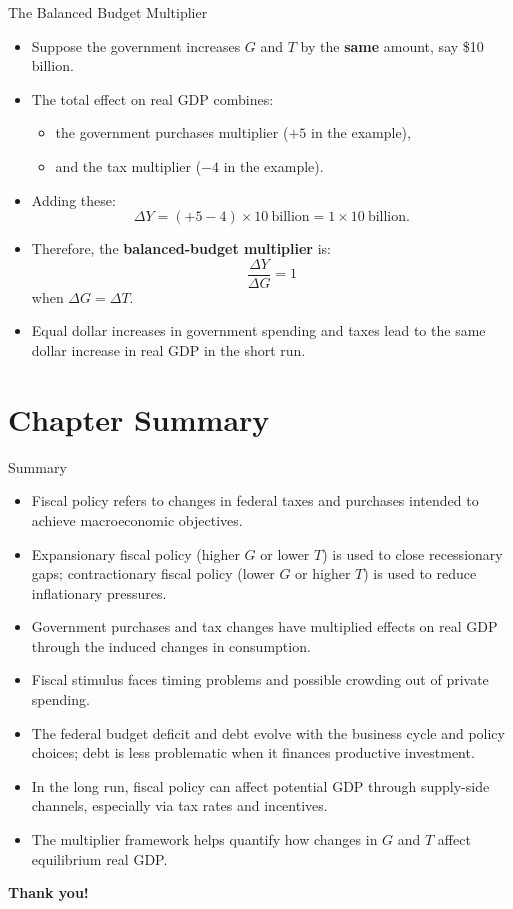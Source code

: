 \documentclass[aspectratio=169]{beamer}
\begin{document}
\begin{frame}{The Balanced Budget Multiplier}
\transfade
\begin{itemize}[<+->]
  \item Suppose the government increases \(G\) and \(T\) by the \textbf{same} amount, say \$10 billion.
  \item The total effect on real GDP combines:
  \begin{itemize}[<+->]
    \item the government purchases multiplier (\(+5\) in the example),
    \item and the tax multiplier (\(-4\) in the example).
  \end{itemize}
  \item Adding these:
  \[
    \Delta Y = (+5 - 4)\times 10\ \text{billion} = 1 \times 10\ \text{billion}.
  \]
  \item Therefore, the \textbf{balanced-budget multiplier} is:
  \[
    \frac{\Delta Y}{\Delta G} = 1
  \]
  when \(\Delta G = \Delta T\).
  \item Equal dollar increases in government spending and taxes lead to the same dollar increase in real GDP in the short run.
\end{itemize}
\end{frame}

\section*{Chapter Summary}

\begin{frame}{Summary}
\transfade
\begin{itemize}[<+->]
  \item Fiscal policy refers to changes in federal taxes and purchases intended to achieve macroeconomic objectives.
  \item Expansionary fiscal policy (higher \(G\) or lower \(T\)) is used to close recessionary gaps;
        contractionary fiscal policy (lower \(G\) or higher \(T\)) is used to reduce inflationary pressures.
  \item Government purchases and tax changes have multiplied effects on real GDP
        through the induced changes in consumption.
  \item Fiscal stimulus faces timing problems and possible crowding out of private spending.
  \item The federal budget deficit and debt evolve with the business cycle and policy choices;
        debt is less problematic when it finances productive investment.
  \item In the long run, fiscal policy can affect potential GDP through supply-side channels,
        especially via tax rates and incentives.
  \item The multiplier framework helps quantify how changes in \(G\) and \(T\) affect equilibrium real GDP.
\end{itemize}
\end{frame}

\begin{frame}
\centering
\Huge \textbf{Thank you!}
\end{frame}
\end{document}
